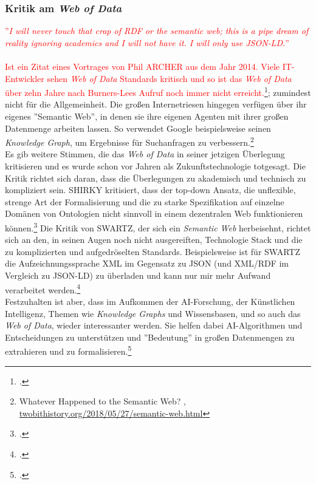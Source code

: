 \documentclass[12pt,a4paper]{article}
\begin{document}
\subsubsection{Kritik am \textit{Web of Data}}
\textcolor{red}{
''\textit{I will never touch that crap of RDF or the semantic web; this is a pipe dream of reality ignoring academics and I will not have it. I will only use JSON-LD.}''
\\
\\
Ist ein Zitat eines Vortrages von Phil ARCHER aus dem Jahr 2014. Viele IT-Entwickler sehen \textit{Web of Data} Standards kritisch und so ist das \textit{Web of Data} über zehn Jahre nach Burners-Lees Aufruf noch immer nicht erreicht.\footcite{wettlaufer2018semanticwebEdition}}; zumindest nicht für die Allgemeinheit. Die großen Internetriesen hingegen verfügen über ihr eigenes ''Semantic Web'', in denen sie ihre eigenen Agenten mit ihrer großen Datenmenge arbeiten lassen. So verwendet Google beispielsweise seinen \textit{Knowledge Graph}, um Ergebnisse für Suchanfragen zu verbessern.\footnote{Whatever Happened to the Semantic Web? , \url{twobithistory.org/2018/05/27/semantic-web.html}}
\\
Es gib weitere Stimmen, die das \textit{Web of Data} in seiner jetzigen Überlegung kritisieren und es wurde schon vor Jahren als Zukunftstechnologie totgesagt. Die Kritik richtet sich daran, dass die Überlegungen zu akademisch und technisch zu kompliziert sein. SHIRKY kritisiert, dass der top-down Ansatz, die unflexible, strenge Art der Formalisierung und die zu starke Spezifikation auf einzelne Domänen von Ontologien nicht sinnvoll in einem dezentralen Web funktionieren können.\footcite{shirky2005ontology} Die Kritik von SWARTZ, der sich ein \textit{Semantic Web} herbeisehnt, richtet sich an den, in seinen Augen noch nicht ausgereiften, Technologie Stack und die zu komplizierten und aufgedröselten Standards. Beispielsweise ist für SWARTZ die Aufzeichnungssprache XML im Gegensatz zu JSON (und XML/RDF im Vergleich zu JSON-LD) zu überladen und kann nur mir mehr Aufwand verarbeitet werden.\footcite{swartz2013aaron}
\\
Festzuhalten ist aber, dass im Aufkommen der AI-Forschung, der Künstlichen Intelligenz, Themen wie \textit{Knowledge Graphs} und Wissensbasen, und so auch das \textit{Web of Data}, wieder interessanter werden. Sie helfen dabei AI-Algorithmen und Entscheidungen zu unterstützen und ''Bedeutung'' in großen Datenmengen zu extrahieren und zu formalisieren.\footcite[][]{bernstein2016new}
\end{document}
